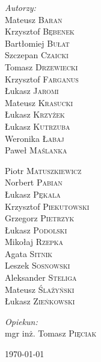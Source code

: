 \documentclass[a4paper, 11pt]{article}
\begin{document}
\begin{titlepage}
\begin{center}
\begin{minipage}{0.27\textwidth}
\begin{flushleft} \large
\emph{Autorzy:}\\
 Mateusz \textsc{Baran} \\
 Krzysztof \textsc{Bębenek} \\
 Bartłomiej \textsc{Bułat} \\
 Szczepan \textsc{Czaicki} \\
 Tomasz \textsc{Drzewiecki} \\
 Krzysztof \textsc{Farganus} \\
 Łukasz \textsc{Jaromi} \\
 Mateusz \textsc{Krasucki} \\
 Łukasz \textsc{Krzyżek} \\
 Łukasz \textsc{Kutrzuba} \\
 Weronika \textsc{Łabaj} \\
 Paweł \textsc{Maślanka} \\
\end{flushleft}
\end{minipage}
\begin{minipage}{0.27\textwidth}
\begin{flushleft} \large
 \phantom{Autorzy:}
 Piotr \textsc{Matuszkiewicz} \\
 Norbert \textsc{Pabian} \\
 Łukasz \textsc{Pękala} \\
 Krzysztof \textsc{Piekutowski} \\
 Grzegorz \textsc{Pietrzyk} \\
 Łukasz \textsc{Podolski} \\
 Mikołaj \textsc{Rzepka} \\
 Agata \textsc{Sitnik} \\
 Leszek \textsc{Sosnowski} \\
 Aleksander \textsc{Steliga} \\
 Mateusz \textsc{Ślażyński} \\
 Łukasz \textsc{Zieńkowski}
\end{flushleft}
\end{minipage}
\begin{minipage}{0.4\textwidth}
\begin{flushright} \large
\emph{Opiekun:} \\
 mgr inż. Tomasz \textsc{Pięciak}
\end{flushright}
\end{minipage}

\vfill

{\large \today}

\end{center}
\end{titlepage}
\end{document}

